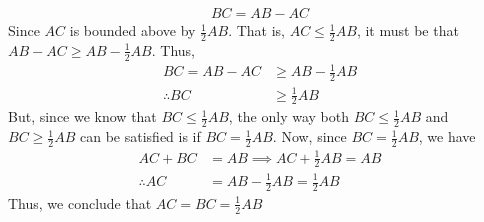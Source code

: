 \documentclass{report}
\begin{document}
    \begin{align*}
        BC = AB - AC
    \end{align*}
    Since $AC$ is bounded above by $\frac{1}{2}AB$. That is, $AC \leq \frac{1}{2} AB$, it must be that $AB - AC \geq AB - \frac{1}{2} AB$. Thus,
    \begin{align*}
        BC = AB - AC &\geq AB - \frac{1}{2} AB \\
        \therefore BC &\geq \frac{1}{2}AB
    \end{align*}
    But, since we know that $BC \leq \frac{1}{2}AB$, the only way both $ BC \leq \frac{1}{2}AB$ and $BC \geq \frac{1}{2} AB$ can be satisfied is if $BC = \frac{1}{2}AB$. Now, since $BC =\frac{1}{2}AB$, we have
    \begin{align*}
        AC + BC &= AB \implies AC + \frac{1}{2}AB = AB \\
        \therefore AC &= AB - \frac{1}{2}AB = \frac{1}{2}AB
    \end{align*}
    \bigbreak \noindent 
    Thus, we conclude that $AC = BC = \frac{1}{2}AB $ \endpf
\end{document}
